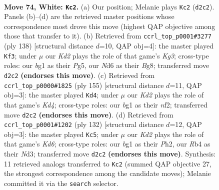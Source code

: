 \documentclass[11pt]{article}
\begin{document}
\clearpage

\begin{figure}[p]\centering
\begin{subfigure}{0.46\textwidth}\centering
\resizebox{\linewidth}{!}{%
\newchessgame
\chessboard[
  setfen={5k2/8/3Nn3/P7/1R6/7r/3K4/6b1 w - - 15 74},
  showmover=false,
  pgfstyle=straightmove, color=movearrow, markmove={d2-c2}
]}
\caption{}
\end{subfigure}\hfill
\begin{subfigure}{0.46\textwidth}\centering
\resizebox{\linewidth}{!}{%
\newchessgame
\chessboard[
  setfen={6B1/8/3k4/5nP1/4R3/6K1/1r6/8 w - - 3 70},
  showmover=false,
  pgfstyle=straightmove, color=movearrow, markmove={g3-f3}
]}
\caption{}
\end{subfigure}
\\[4pt]
\begin{subfigure}{0.46\textwidth}\centering
\resizebox{\linewidth}{!}{%
\newchessgame
\chessboard[
  setfen={8/5n2/8/3k4/5K2/r7/5NN1/8 b - - 31 78},
  showmover=false,
  pgfstyle=straightmove, color=movearrow, markmove={d5-d4}
]}
\caption{}
\end{subfigure}\hfill
\begin{subfigure}{0.46\textwidth}\centering
\resizebox{\linewidth}{!}{%
\newchessgame
\chessboard[
  setfen={3n4/8/3K4/6k1/8/3N3n/7P/8 w - - 14 67},
  showmover=false,
  pgfstyle=straightmove, color=movearrow, markmove={d6-c5}
]}
\caption{}
\end{subfigure}
\caption{\textbf{Move 74, White: \texttt{Kc2}.} (a) Our position; Melanie plays \texttt{Kc2} (\texttt{d2c2}). Panels (b)--(d) are the retrieved master positions whose correspondence most drove this move (highest QAP objective among those that transfer to it). (b) Retrieved from \texttt{ccrl\_top\_p0001\#3277} (ply 138) [structural distance $d$=10, QAP obj=4]: the master played \texttt{Kf3}; under $\mu$ our \emph{Kd2} plays the role of that game's \emph{Kg3}; cross-type roles: our \emph{b}g1 as their \emph{P}g5, our \emph{N}d6 as their \emph{B}g8; transferred move \texttt{d2c2} \textbf{(endorses this move)}. (c) Retrieved from \texttt{ccrl\_top\_p0000\#1825} (ply 155) [structural distance $d$=11, QAP obj=3]: the master played \texttt{Kd4}; under $\mu$ our \emph{Kd2} plays the role of that game's \emph{Kd4}; cross-type roles: our \emph{b}g1 as their \emph{n}f2; transferred move \texttt{d2c2} \textbf{(endorses this move)}. (d) Retrieved from \texttt{ccrl\_top\_p0001\#1202} (ply 132) [structural distance $d$=12, QAP obj=3]: the master played \texttt{Kc5}; under $\mu$ our \emph{Kd2} plays the role of that game's \emph{Kd6}; cross-type roles: our \emph{b}g1 as their \emph{P}h2, our \emph{R}b4 as their \emph{N}d3; transferred move \texttt{d2c2} \textbf{(endorses this move)}. Synthesis: 11 retrieved analogs transferred to \texttt{Kc2} (summed QAP objective 27, the strongest correspondence among the candidate moves); Melanie committed it via the \texttt{search} selector.}
\label{fig:thought-m146}
\end{figure}
\end{document}
